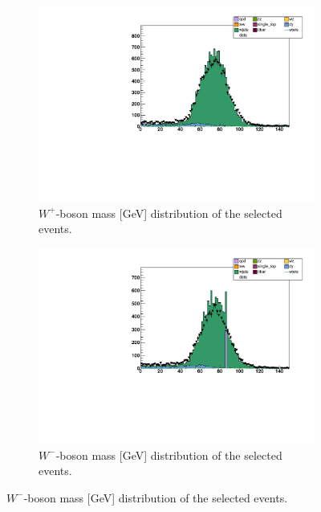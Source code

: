 \documentclass[%
 reprint,
 amsmath,amssymb,
 aps,
]{revtex4-2}
\begin{document}
\begin{figure}
        \centering
        \begin{subfigure}[b]{0.475\textwidth}
            \centering
            \includegraphics[width=\textwidth]{Plots/part2/W_mass_p.pdf}
            \caption{$W^+$-boson mass [GeV] distribution of the selected events.}    
            \label{fig:mean and std of net14}
        \end{subfigure}
        \hfill
        \begin{subfigure}[b]{0.475\textwidth}  
            \centering 
            \includegraphics[width=\textwidth]{Plots/part2/W_mass_n.pdf}
            \caption{$W^-$-boson mass [GeV] distribution of the selected events.}    
            \label{fig:mean and std of net24}
        \end{subfigure}

\end{figure}
\end{document}
